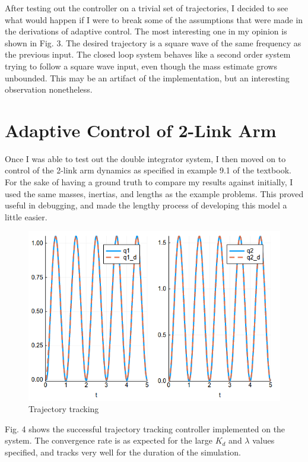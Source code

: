 \documentclass[12pt]{article}
\begin{document}
\noindent
After testing out the controller on a trivial set of trajectories, I decided to see what would happen if I were to break some of the assumptions that were made in the derivations of adaptive control. The most interesting one in my opinion is shown in Fig. 3. The desired trajectory is a square wave of the same frequency as the previous input. The closed loop system behaves like a second order system trying to follow a square wave input, even though the mass estimate grows unbounded. This may be an artifact of the implementation, but an interesting observation nonetheless.
\\


\section{Adaptive Control of 2-Link Arm}

Once I was able to test out the double integrator system, I then moved on to control of the 2-link arm dynamics as specified in example 9.1 of the textbook. For the sake of having a ground truth to compare my results against initially, I used the same masses, inertias, and lengths as the example problems. This proved useful in debugging, and made the lengthy process of developing this model a little easier.
\\


\begin{figure}[H]
    \centering
    \includegraphics[width=3.5in\textsize]{arm_trajectory_tracking2.png}
    \caption{Trajectory tracking}
    \label{fig:arm1}
\end{figure}

\noindent
Fig. 4 shows the successful trajectory tracking controller implemented on the system. The convergence rate is as expected for the large $ K_d$ and $\lambda$ values specified, and tracks very well for the duration of the simulation.
\end{document}
